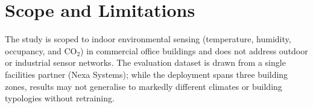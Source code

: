 \section{Scope and Limitations}

The study is scoped to indoor environmental sensing (temperature, humidity, occupancy, and
CO$_2$) in commercial office buildings and does not address outdoor or industrial sensor
networks. The evaluation dataset is drawn from a single facilities partner (Nexa Systems); while
the deployment spans three building zones, results may not generalise to markedly different
climates or building typologies without retraining.
